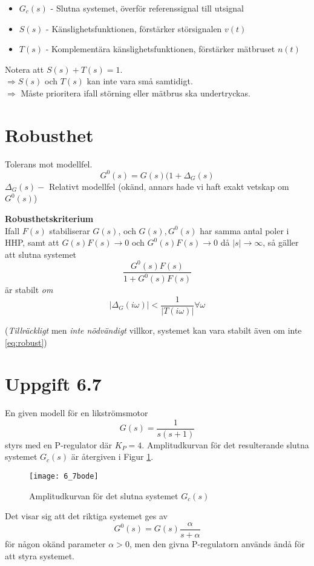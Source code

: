 \documentclass[12pt]{article}
\begin{document}
\begin{itemize}
\item $G_c(s)$ - Slutna systemet, överför referenssignal till utsignal
\item $S(s)$ - Känslighetsfunktionen, förstärker störsignalen $v(t)$ 
\item $T(s)$ - Komplementära känslighetsfunktionen, förstärker mätbruset $n(t)$
\end{itemize}
Notera att $S(s) + T(s) = 1$. \\
$\Rightarrow S(s)$ och $T(s)$ kan inte vara små samtidigt. \\
$\Rightarrow$ Måste prioritera ifall störning eller mätbrus ska undertryckas.

\section*{Robusthet}
Tolerans mot modellfel.
\[G^0(s) = G(s)(1 + \Delta_G(s)\]
$\Delta_G(s) -$ Relativt modellfel (okänd, annars hade vi haft exakt vetskap om $G^0(s)$)

\textbf{Robusthetskriterium} \\
Ifall $F(s)$ stabiliserar $G(s)$, och $G(s), G^0(s)$ har samma antal poler i HHP, samt att $G(s)F(s) \to 0$ och $G^0(s)F(s) \to 0$ då $|s| \to \infty$, så gäller att slutna systemet
\[\frac{G^0(s)F(s)}{1 + G^0(s)F(s)}\]
är stabilt \emph{om}
\begin{equation}
|\Delta_G(i\omega)| < \frac{1}{|T(i\omega)|} \forall \omega\label{eq:robust}
\end{equation}

(\emph{Tillräckligt} men \emph{inte nödvändigt} villkor, systemet kan vara stabilt även om inte \eqref{eq:robust})

\section*{Uppgift 6.7}
En given modell för en likströmsmotor
\[G(s) = \frac{1}{s(s+1)}\]
styrs med en P-regulator där $K_P = 4$. Amplitudkurvan för det resulterande slutna systemet $G_c(s)$ är återgiven i Figur \ref{fig:67bode}.
\begin{figure}[h!]
  \centering
  \texttt{[image: 6\_7bode]}
  \caption{Amplitudkurvan för det slutna systemet $G_c(s)$}
  \label{fig:67bode}
\end{figure}
\FloatBarrier
Det visar sig att det riktiga systemet ges av
\[G^0(s) = G(s)\frac{\alpha}{s + \alpha}\]
för någon okänd parameter $\alpha > 0$, men den givna P-regulatorn används ändå för att styra systemet.
\end{document}
